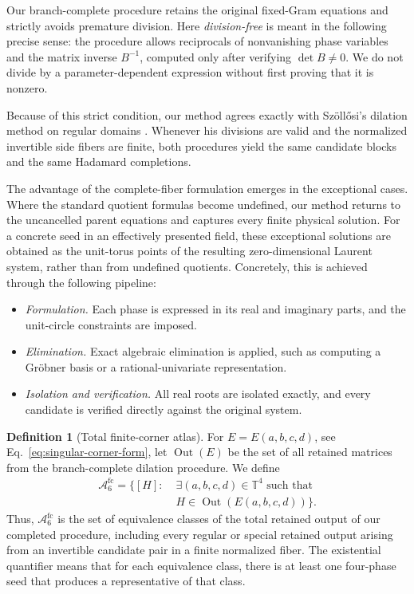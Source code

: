 \documentclass[aps,prx,reprint,nofootinbib,twoside,superscriptaddress,longbibliography,floatfix]{revtex4-2}
\theoremstyle{definition}
\newtheorem{definition}[theorem]{Definition}
\newcommand{\T}{\mathbb T}
\newcommand{\FCAtlas}{\mathcal A}
\begin{document}
Our branch-complete procedure retains the original fixed-Gram equations and strictly avoids premature division. Here \emph{division-free} is meant in the following precise sense: the procedure allows reciprocals of nonvanishing phase variables and the matrix inverse $B^{-1}$, computed only after verifying $\det B\neq0$. We do not divide by a parameter-dependent expression without first proving that it is nonzero.

Because of this strict condition, our method agrees exactly with Sz\"oll\H{o}si's dilation method on regular domains \cite{Szollosi2012FourParameter}. Whenever his divisions are valid and the normalized invertible side fibers are finite, both procedures yield the same candidate blocks and the same Hadamard completions.

The advantage of the complete-fiber formulation emerges in the exceptional cases. Where the standard quotient formulas become undefined, our method returns to the uncancelled parent equations and captures every finite physical solution. For a concrete seed in an effectively presented field, these exceptional solutions are obtained as the unit-torus points of the resulting zero-dimensional Laurent system, rather than from undefined quotients. Concretely, this is achieved through the following pipeline:
\begin{itemize}
\item \emph{Formulation.} Each phase is expressed in its real and imaginary parts, and the unit-circle constraints are imposed.
\item \emph{Elimination.} Exact algebraic elimination is applied, such as computing a Gr\"obner basis or a rational-univariate representation.
\item \emph{Isolation and verification.} All real roots are isolated exactly, and every candidate is verified directly against the original system.
\end{itemize}

\begin{definition}[Total finite-corner atlas]
\label{def:completed-output}
For $E=E(a,b,c,d)$, see Eq.~\ref{eq:singular-corner-form}, let $\operatorname{Out}(E)$ be the set of all retained matrices from the branch-complete dilation procedure.
We define
\begin{equation}
\begin{aligned}
\FCAtlas_6^{\mathrm{fc}}=\bigl\{[H]:\;&\exists(a,b,c,d)\in\T^4
\text{ such that}\\[-2pt]
&H\in\operatorname{Out}(E(a,b,c,d))\bigr\}.
\end{aligned}
\label{eq:Gdefinition}
\end{equation}
Thus, $\FCAtlas_6^{\mathrm{fc}}$ is the set of equivalence classes of the total retained output of our completed procedure, including every regular or special retained output arising from an invertible candidate pair in a finite normalized fiber. The existential quantifier means that for each equivalence class, there is at least one four-phase seed that produces a representative of that class. 
\end{definition}
\end{document}
